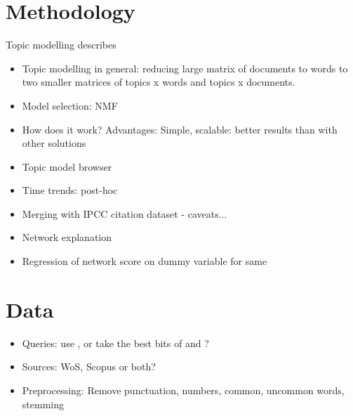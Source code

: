 \documentclass{article}
\begin{document}
\section*{Methodology}

Topic modelling describes 

\begin{itemize}
\item Topic modelling in general: reducing large matrix of documents to words to two smaller matrices of topics x words and topics x documents.
\item Model selection: NMF \citep{Lee1999}
\item How does it work? Advantages: Simple, scalable: better results than with other solutions%
\item Topic model browser \citet{Chaney2012}
\item Time trends: post-hoc \citep{Hall2008}
\item Merging with IPCC citation dataset - caveats...
\item Network explanation
\item Regression of network score on dummy variable for same

\end{itemize}

\section{Data}
\begin{itemize}
	\item Queries: use \citet{Grieneisen2011}, or take the best bits of \citet{Grieneisen2011} and \citet{Haunschild2016}?
    \item Sources: WoS, Scopus or both?
    \item Preprocessing: Remove punctuation, numbers, common, uncommon words, stemming
\end{itemize}





\listoffigures
\linespread{1}


\end{document}
